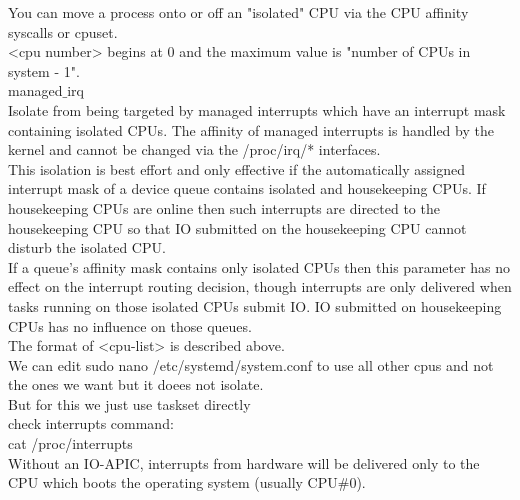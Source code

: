 \documentclass[11pt, a4paper, oneside]{article}
\theoremstyle{definition}
\begin{document}
                          You can move a process onto or off an "isolated" CPU via
                          the CPU affinity syscalls or cpuset.\\
                          <cpu number> begins at 0 and the maximum value is
                          "number of CPUs in system - 1".\\

                        managed$\_$irq\\

                          Isolate from being targeted by managed interrupts
                          which have an interrupt mask containing isolated
                          CPUs. The affinity of managed interrupts is
                          handled by the kernel and cannot be changed via
                          the /proc/irq/* interfaces.\\

                          This isolation is best effort and only effective
                          if the automatically assigned interrupt mask of a
                          device queue contains isolated and housekeeping
                          CPUs. If housekeeping CPUs are online then such
                          interrupts are directed to the housekeeping CPU
                          so that IO submitted on the housekeeping CPU
                          cannot disturb the isolated CPU.\\

                          If a queue's affinity mask contains only isolated
                          CPUs then this parameter has no effect on the
                          interrupt routing decision, though interrupts are
                          only delivered when tasks running on those
                          isolated CPUs submit IO. IO submitted on
                          housekeeping CPUs has no influence on those
                          queues.\\

                        The format of <cpu-list> is described above.\\


We can edit sudo nano /etc/systemd/system.conf to use all other cpus and not the ones we want
but it doees not isolate.\\
But for this we just use taskset directly\\

check interrupts command:\\
cat /proc/interrupts \\
Without an IO-APIC, interrupts from hardware will be delivered only to the CPU which boots the operating system (usually CPU$\#$0).\\
\end{document}
